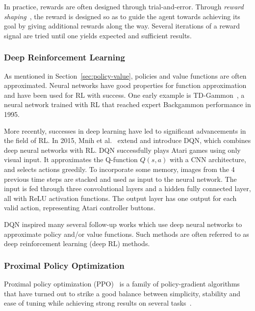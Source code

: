In practice, rewards are often designed through trial-and-error.
Through \textit{reward shaping}~\cite{mataric_reward_1994},
the reward is designed so as to guide the agent towards achieving its goal by giving additional rewards along the way.
Several iterations of a reward signal are tried until one yields expected and sufficient results.

\subsubsection{Deep Reinforcement Learning}

As mentioned in Section~\ref{sec:policy-value}, policies and value functions are often approximated.
Neural networks have good properties for function approximation and have been used for RL with success.
One early example is TD-Gammon~\cite{tesauro_temporal_1995}, a neural network trained with RL that reached expert Backgammon performance in 1995.

More recently, successes in deep learning have led to significant advancements in the field of RL.
In 2015, Mnih et al.~\cite{mnih_human-level_2015} extend \cite{mnih_playing_2013} and introduce DQN, which combines deep neural networks with RL.
DQN successfully plays Atari games using only visual input.
It approximates the Q-function \(Q(s, a)\) with a CNN architecture, and selects actions greedily.
To incorporate some memory, images from the 4 previous time steps are stacked and used as input to the neural network.
The input is fed through three convolutional layers and a hidden fully connected layer, all with ReLU activation functions.
The output layer has one output for each valid action, representing Atari controller buttons.

DQN inspired many several follow-up works which use deep neural networks to approximate policy and/or value functions.
Such methods are often referred to as deep reinforcement learning (deep RL) methods.

\subsubsection{Proximal Policy Optimization}
\label{sec:ppo}

Proximal policy optimization (PPO)~\cite{schulman_proximal_2017} is a family of policy-gradient algorithms that have turned out to strike a good balance between simplicity, stability and ease of tuning while achieving strong results on several tasks~\cite{schulman_proximal_2017,henderson_deep_2018,cobbe_leveraging_2020,vinyals_grandmaster_2019,andrychowicz_what_2020}.

